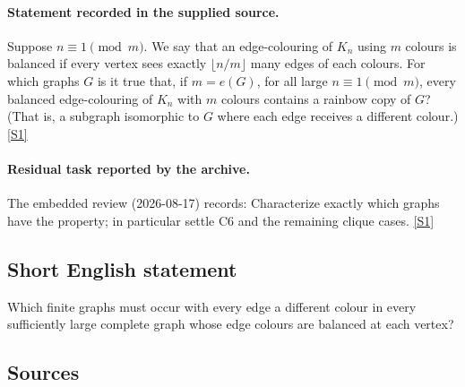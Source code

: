 \documentclass[11pt,a4paper]{article}
\newcommand{\sref}[2]{\hyperlink{source:#1:#2}{[S#2]}}
\begin{document}
\paragraph{Statement recorded in the supplied source.}
Suppose $n\equiv 1\pmod{m}$. We say that an edge-colouring of $K_n$ using $m$ colours is balanced if every vertex sees exactly $\lfloor n/m\rfloor$ many edges of each colours.
For which graphs $G$ is it true that, if $m=e(G)$, for all large $n\equiv 1\pmod{m}$, every balanced edge-colouring of $K_n$ with $m$ colours contains a rainbow copy of $G$? (That is, a subgraph isomorphic to $G$ where each edge receives a different colour.) \sref{2316}{1}

\paragraph{Residual task reported by the archive.}

The embedded review (2026-08-17) records: Characterize exactly which graphs have the property; in particular settle C6 and the remaining clique cases. \sref{2316}{1}

\subsection{Short English statement}

Which finite graphs must occur with every edge a different colour in every sufficiently large complete graph whose edge colours are balanced at each vertex?

\subsection{Sources}
\end{document}
